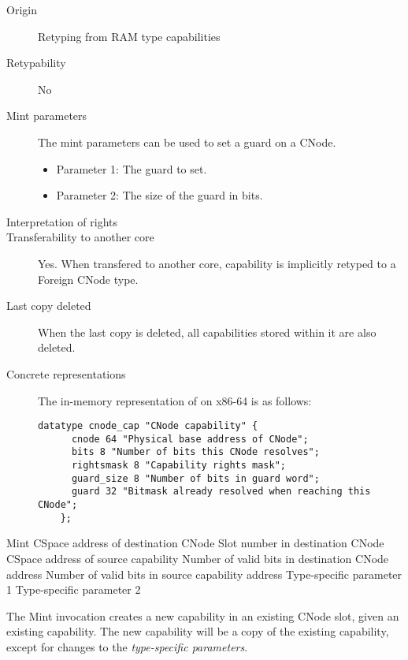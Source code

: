 \begin{description}
\item[Origin] Retyping from RAM type capabilities

\item[Retypability] No

\item[Mint parameters] The mint parameters can be used to set a guard
  on a CNode.
  \begin{itemize}
  \item Parameter 1: The guard to set.
  \item Parameter 2: The size of the guard in bits.
  \end{itemize}

\item[Interpretation of rights] 

\item[Transferability to another core] Yes.  When transfered to
  another core, capability is implicitly retyped to a Foreign CNode
  type. 

\item[Last copy deleted] When the last copy is deleted, all
  capabilities stored within it are also deleted.

\item[Concrete representations] The in-memory representation of on
  x86-64 is as follows:
    
  \begin{lstlisting}[language=Mackerel]
    datatype cnode_cap "CNode capability" {
      cnode 64 "Physical base address of CNode";
      bits 8 "Number of bits this CNode resolves";
      rightsmask 8 "Capability rights mask";
      guard_size 8 "Number of bits in guard word";
      guard 32 "Bitmask already resolved when reaching this CNode";
    };
    \end{lstlisting}
\end{description}
  
\begin{invocation}{Mint}\label{sec:mint}
  \arg CSpace address of destination CNode
  \arg Slot number in destination CNode
  \arg CSpace address of source capability
  \arg Number of valid bits in destination CNode address
  \arg Number of valid bits in source capability address
  \arg Type-specific parameter 1
  \arg Type-specific parameter 2
\end{invocation}
The Mint invocation creates a new capability in an existing CNode
slot, given an existing capability.  The new capability will be a copy
of the existing capability, except for changes to the
\emph{type-specific parameters}.

